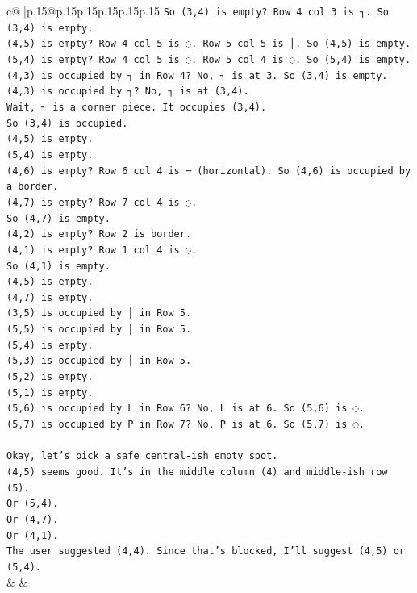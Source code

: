 \documentclass{article}
\begin{document}
{\begin{supertabular}{c@{$\;$}|p{.15\linewidth}@{}p{.15\linewidth}p{.15\linewidth}p{.15\linewidth}p{.15\linewidth}p{.15\linewidth}}
{{{\texttt{So (3,4) is empty? Row 4 col 3 is ┐. So (3,4) is empty.} \\
\texttt{(4,5) is empty? Row 4 col 5 is ◌. Row 5 col 5 is │. So (4,5) is empty.} \\
\texttt{(5,4) is empty? Row 4 col 5 is ◌. Row 5 col 4 is ◌. So (5,4) is empty.} \\
\texttt{(4,3) is occupied by ┐ in Row 4? No, ┐ is at 3. So (3,4) is empty. (4,3) is occupied by ┐? No, ┐ is at (3,4).} \\
\texttt{Wait, ┐ is a corner piece. It occupies (3,4).} \\
\texttt{So (3,4) is occupied.} \\
\texttt{(4,5) is empty.} \\
\texttt{(5,4) is empty.} \\
\texttt{(4,6) is empty? Row 6 col 4 is ─ (horizontal). So (4,6) is occupied by a border.} \\
\texttt{(4,7) is empty? Row 7 col 4 is ◌.} \\
\texttt{So (4,7) is empty.} \\
\texttt{(4,2) is empty? Row 2 is border.} \\
\texttt{(4,1) is empty? Row 1 col 4 is ◌.} \\
\texttt{So (4,1) is empty.} \\
\texttt{(4,5) is empty.} \\
\texttt{(4,7) is empty.} \\
\texttt{(3,5) is occupied by │ in Row 5.} \\
\texttt{(5,5) is occupied by │ in Row 5.} \\
\texttt{(5,4) is empty.} \\
\texttt{(5,3) is occupied by │ in Row 5.} \\
\texttt{(5,2) is empty.} \\
\texttt{(5,1) is empty.} \\
\texttt{(5,6) is occupied by L in Row 6? No, L is at 6. So (5,6) is ◌.} \\
\texttt{(5,7) is occupied by P in Row 7? No, P is at 6. So (5,7) is ◌.} \\
\\ 
\texttt{Okay, let's pick a safe central{-}ish empty spot.} \\
\texttt{(4,5) seems good. It's in the middle column (4) and middle{-}ish row (5).} \\
\texttt{Or (5,4).} \\
\texttt{Or (4,7).} \\
\texttt{Or (4,1).} \\
\texttt{The user suggested (4,4). Since that's blocked, I'll suggest (4,5) or (5,4).} \\
            }
        }
    }
    & & \\ \\


\end{supertabular}}
\end{document}
